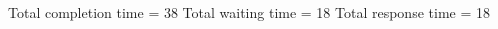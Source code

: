 \begin{RTGrid}[width=0.8\textwidth]{5}{20}
\end{RTGrid}\newline\newline
Total completion time = 38\newline
Total waiting time = 18\newline
Total response time = 18\newline
